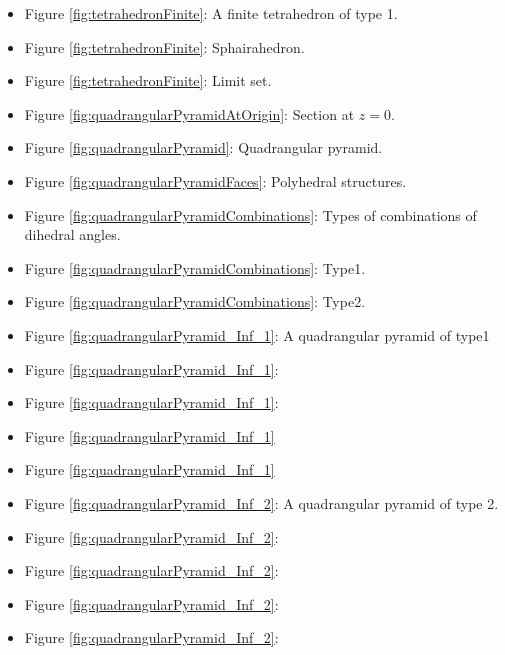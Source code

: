 \documentclass[suppldata, dvipdfmx]{interact}
\theoremstyle{plain}%
\theoremstyle{definition}
\theoremstyle{remark}
\theoremstyle{problemstyle}
\begin{document}
\begin{itemize}
\item Figure \ref{fig:tetrahedronFinite}: A finite tetrahedron of type
      1.
\item Figure
      \ref{fig:tetrahedronFinite}:
      Sphairahedron.
\item Figure
      \ref{fig:tetrahedronFinite}:
      Limit set. 

\item Figure \ref{fig:quadrangularPyramidAtOrigin}: Section at $z=0$.
\item Figure \ref{fig:quadrangularPyramid}: Quadrangular pyramid.
\item Figure \ref{fig:quadrangularPyramidFaces}: Polyhedral structures.

\item Figure \ref{fig:quadrangularPyramidCombinations}: Types of
      combinations of dihedral angles.
\item Figure
      \ref{fig:quadrangularPyramidCombinations}:
      Type1.
\item Figure
      \ref{fig:quadrangularPyramidCombinations}:
      Type2.
\item Figure \ref{fig:quadrangularPyramid_Inf_1}: A quadrangular pyramid
      of type1
\item Figure
      \ref{fig:quadrangularPyramid_Inf_1}:
\item Figure
      \ref{fig:quadrangularPyramid_Inf_1}:
\item Figure \ref{fig:quadrangularPyramid_Inf_1}
\item Figure
      \ref{fig:quadrangularPyramid_Inf_1}

\item Figure \ref{fig:quadrangularPyramid_Inf_2}: A quadrangular pyramid
      of type 2.
\item Figure
      \ref{fig:quadrangularPyramid_Inf_2}: 
\item Figure
      \ref{fig:quadrangularPyramid_Inf_2}: 
\item Figure \ref{fig:quadrangularPyramid_Inf_2}:
\item Figure
      \ref{fig:quadrangularPyramid_Inf_2}: 


\end{itemize}
\end{document}
